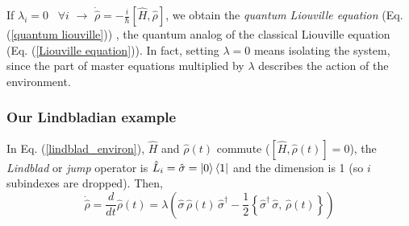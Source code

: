 \documentclass[11pt]{article}
\numberwithin{equation}{section} %
\numberwithin{figure}{section} %
\begin{document}
\begin{appendices}
If $\lambda_i=0$ $\,$ $\forall i$ $\rightarrow$ $\dot{\hat{\rho}}=-\frac{i}{\hbar}[\hat{H},\hat{\rho}]$, we obtain the \emph{quantum Liouville equation} (Eq. (\ref{quantum liouville})) \cite[p.~185, Eq.~(3.4.29)]{Sakurai}, the quantum analog of the classical Liouville equation (Eq. (\ref{Liouville equation})). In fact, setting $\lambda=0$ means isolating the system, since the part of master equations multiplied by $\lambda$ describes the action of the environment.

\subsubsection{Our Lindbladian example}
In Eq. (\ref{lindblad_environ}), $\hat{H}$ and $\hat{\rho}(t)$ commute ($[\hat{H},\hat{\rho}(t)]=0$), the \emph{Lindblad} or \emph{jump} operator is $\hat{L}_i=\hat{\sigma}=\ket{0}\bra{1}$ and the dimension is 1 (so $i$ subindexes are dropped). Then, 
 \begin{equation} \label{lindbla_origin}
\dot{\hat{\rho}}=\frac{d}{dt}\hat{\rho}(t)=\lambda\left(\hat{\sigma}\,\hat{\rho}(t)\,\hat{\sigma}^\dagger -\frac{1}{2}\left\lbrace\hat{\sigma}^\dagger\,\hat{\sigma},\,\hat{\rho}(t)\right\rbrace\right)
\end{equation} 


\end{appendices}
\end{document}
